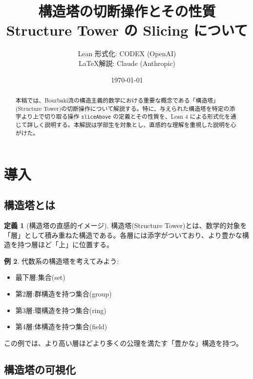 \documentclass[a4paper,11pt]{article}
\title{構造塔の切断操作とその性質\\{\large Structure Tower の Slicing について}}
\author{%
    Lean 形式化: CODEX (OpenAI)\\
    \LaTeX 解説: Claude (Anthropic)
}
\date{\today}
\theoremstyle{definition}
\newtheorem{definition}{定義}[section]
\newtheorem{example}[definition]{例}
\begin{document}
\maketitle

\begin{abstract}
本稿では、Bourbaki流の構造主義的数学における重要な概念である「構造塔」(Structure Tower)の切断操作について解説する。特に、与えられた構造塔を特定の添字より上で切り取る操作 \texttt{sliceAbove} の定義とその性質を、Lean 4 による形式化を通じて詳しく説明する。本解説は学部生を対象とし、直感的な理解を重視した説明を心がけた。
\end{abstract}

\tableofcontents

\section{導入}

\subsection{構造塔とは}

\begin{definition}[構造塔の直感的イメージ]
構造塔(Structure Tower)とは、数学的対象を「層」として積み重ねた構造である。各層には添字がついており、より豊かな構造を持つ層ほど「上」に位置する。
\end{definition}

\begin{example}
代数系の構造塔を考えてみよう:
\begin{itemize}
    \item 最下層:集合(set)
    \item 第2層:群構造を持つ集合(group)
    \item 第3層:環構造を持つ集合(ring)
    \item 第4層:体構造を持つ集合(field)
\end{itemize}
この例では、より高い層ほどより多くの公理を満たす「豊かな」構造を持つ。
\end{example}

\subsection{構造塔の可視化}
\end{document}

